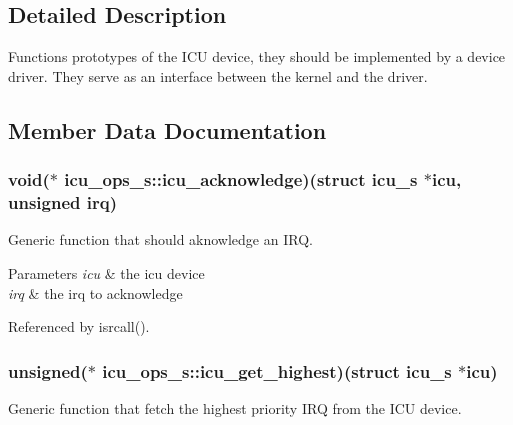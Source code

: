 \subsection{Detailed Description}
Functions prototypes of the I\-C\-U device, they should be implemented by a device driver. They serve as an interface between the kernel and the driver. 

\subsection{Member Data Documentation}
\hypertarget{structicu__ops__s_aec94869f891ee17f4743f46da01dcced}{
\subsubsection[{icu\-\_\-acknowledge}]{\setlength{\rightskip}{0pt plus 5cm}void($\ast$ icu\-\_\-ops\-\_\-s\-::icu\-\_\-acknowledge)(struct {\bf icu\-\_\-s} $\ast$icu, unsigned irq)}}\label{structicu__ops__s_aec94869f891ee17f4743f46da01dcced}


Generic function that should aknowledge an I\-R\-Q. 


\begin{DoxyParams}{Parameters}
{\em icu} & the icu device \\
\hline
{\em irq} & the irq to acknowledge \\
\hline
\end{DoxyParams}


Referenced by isrcall().

\hypertarget{structicu__ops__s_a7aa5d37f9a8ef9f3e59211ff5ab213c0}{
\subsubsection[{icu\-\_\-get\-\_\-highest}]{\setlength{\rightskip}{0pt plus 5cm}unsigned($\ast$ icu\-\_\-ops\-\_\-s\-::icu\-\_\-get\-\_\-highest)(struct {\bf icu\-\_\-s} $\ast$icu)}}\label{structicu__ops__s_a7aa5d37f9a8ef9f3e59211ff5ab213c0}


Generic function that fetch the highest priority I\-R\-Q from the I\-C\-U device. 


